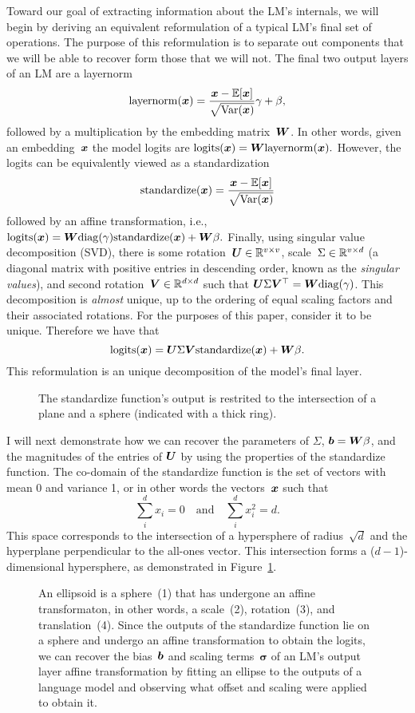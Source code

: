 \documentclass{article}
\newcommand\layernorm{\mathrm{layernorm}}
\newcommand\standardize{\mathrm{standardize}}
\newcommand\logits{\mathrm{logits}}
\newcommand\diag{\mathrm{diag}}
\begin{document}
Toward our goal of extracting information about the LM's internals,
we will begin by deriving an equivalent reformulation 
of a typical LM's final set of operations.
The purpose of this reformulation is to separate out components 
that we will be able to recover form those that we will not.
The final two output layers of an LM are a layernorm
\[\layernorm(\vx)=\frac{\vx-\E[\vx]}{\sqrt{\Var(\vx)}}\gamma + \beta,\]
followed by a multiplication by the embedding matrix~\({\bm{W}}\). 
In other words, given an embedding~\({\bm{x}}\)
the model logits are \(\logits(\vx)=\mW\layernorm(\vx).\)
However, the logits can be equivalently viewed as a standardization
\[\standardize(\vx)=\frac{\vx-\E[\vx]}{\sqrt{\Var(\vx)}}\]
followed by an affine transformation, i.e.,
\(\logits(\vx)=\mW\diag(\gamma)\standardize(\vx) + \mW\beta.\)
Finally, using singular value decomposition (SVD),
there is some rotation~\({\bm{U}}\in\mathbb{R}^{v\times v}\),
scale~\(\Sigma\in\mathbb{R}^{v\times d}\) 
(a diagonal matrix with positive entries in descending order, known as the \emph{singular values}),
and second rotation~\({\bm{V}}\in\mathbb{R}^{d\times d}\)
such that \(\mU\Sigma\mV^\top=\mW\diag(\gamma)\).
This decomposition is \emph{almost} unique,
up to the ordering of equal scaling factors and their associated rotations.
For the purposes of this paper, consider it to be unique.
Therefore we have that 
\[\logits(\vx)=\mU\Sigma\mV\standardize(\vx)+\mW\beta.\]
This reformulation is an unique decomposition of the model's final layer.

\begin{figure}
  \centering
  \small
  
  \caption{The standardize function's output is restrited to the intersection of a plane and a sphere (indicated with a thick ring).}
  \label{fig:standardize}
\end{figure}

I will next demonstrate how we can recover the parameters of \(\Sigma\), 
\({\bm{b}}={\bm{W}}\beta\), and the magnitudes of the entries of \({\bm{U}}\)
by using the properties of the standardize function.
The co-domain of the standardize function
is the set of vectors with mean 0 and variance 1,
or in other words the vectors~\({\bm{x}}\) such that 
\[\sum_i^dx_i=0\quad\text{and}\quad \sum_i^dx_i^2=d.\]
This space corresponds to the intersection of a hypersphere of radius~\(\sqrt{d}\)
and the hyperplane perpendicular to the all-ones vector.
This intersection forms a (\(d-1\))-dimensional hypersphere,
as demonstrated in Figure~\ref{fig:standardize}.

\begin{figure}
  \centering
  
  \caption{
    An ellipsoid is a sphere~(1) that has undergone an affine transformaton, in other words, a scale~(2), rotation~(3), and translation~(4).
    Since the outputs of the standardize function lie on a sphere
    and undergo an affine transformation to obtain the logits,
    we can recover the bias~\({\bm{b}}\) and scaling terms~\(\boldsymbol\sigma\)
    of an LM's output layer affine transformation
    by fitting an ellipse to the outputs of a language model 
    and observing what offset and scaling were applied to obtain it.
  }
\end{figure}
\end{document}
